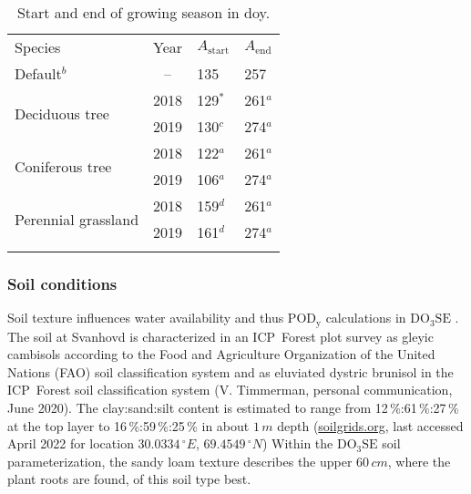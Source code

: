 \documentclass[bg, manuscript]{copernicus}
\begin{document}
\begin{table}[t]
  \caption{Start and end of growing season in \unit{doy}.}
  \label{tab:sensitivity_tests_gs}
  \begin{tabular}{lcll}
    \tophline
    Species & Year & $A_\mathrm{start}$ & $A_\mathrm{end}$\\
    \middlehline
    Default$^b$ & -- & 135 & 257\\
    \multirow{2}{*}{Deciduous tree} & 2018 & 129$^*$ & 261$^a$ \\
    & 2019 & 130$^c$ & 274$^a$ \\
    \multirow{2}{*}{Coniferous tree} & 2018 & 122$^a$ & 261$^a$ \\
    & 2019 & 106$^a$ & 274$^a$ \\
    \multirow{2}{*}{Perennial grassland} & 2018 & 159$^d$ & 261$^a$\\
    & 2019 & 161$^d$ & 274$^a$ \\
    \bottomhline
  \end{tabular}
\end{table}

\subsubsection{Soil conditions}
\label{subsec:soil}

Soil texture influences water availability and thus $\mathrm{POD_y}$ calculations in $\mathrm{DO_3SE}$ \citep{ACP:Bueker2012}. The soil at Svanhovd is characterized in an ICP~Forest plot survey as gleyic cambisols according to the Food and Agriculture Organization of the United Nations (FAO) soil classification system and as eluviated dystric brunisol in the ICP~Forest soil classification system (V. Timmerman, personal communication, June 2020). The clay:sand:silt content is estimated to range from 12\,\%:61\,\%:27\,\% at the top layer to 16\,\%:59\,\%:25\,\% in about $1\,\unit{m}$ depth (\href{https://soilgrids.org/}{soilgrids.org}, last accessed April 2022 for location $30.0334\,\unit{^\circ E}$, $69.4549\,\unit{^\circ N}$) Within the $\mathrm{DO_3SE}$ soil parameterization, the sandy loam texture describes the upper $60\,\unit{cm}$, where the plant roots are found, of this soil type best. 
\end{document}
